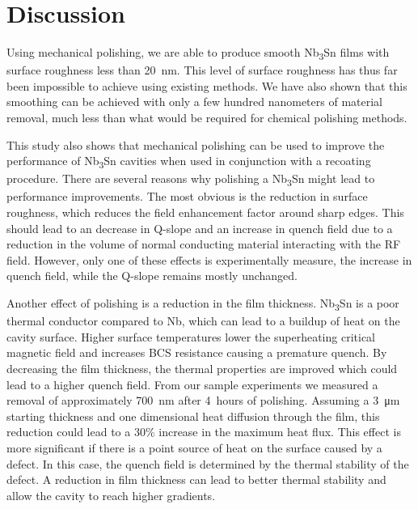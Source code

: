 \documentclass[reprint,amsmath,amssymb,aps]{revtex4-2}%
\begin{document}
%
\section{Discussion}%
\label{sec:Discussion}%
Using mechanical polishing, we are able to produce smooth Nb\textsubscript{3}Sn films with surface roughness less than 20~nm. This level of surface roughness has thus far been impossible to achieve using existing methods.\cite{posen2021advances,pudasaini2018studies,pudasaini2017post,hu2019reducing} We have also shown that this smoothing can be achieved with only a few hundred nanometers of material removal, much less than what would be required for chemical polishing methods.

This study also shows that mechanical polishing can be used to improve the performance of Nb\textsubscript{3}Sn cavities when used in conjunction with a recoating procedure. There are several reasons why polishing a Nb\textsubscript{3}Sn might lead to performance improvements. The most obvious is the reduction in surface roughness, which reduces the field enhancement factor around sharp edges. This should lead to an decrease in Q-slope and an increase in quench field\cite{knobloch1999high, xu2016simulation} due to a reduction in the volume of normal conducting material interacting with the RF field. However, only one of these effects is experimentally measure, the increase in quench field, while the Q-slope remains mostly unchanged.

Another effect of polishing is a reduction in the film thickness. Nb\textsubscript{3}Sn is a poor thermal conductor compared to Nb, which can lead to a buildup of heat on the cavity surface. Higher surface temperatures lower the superheating critical magnetic field and increases BCS resistance causing a premature quench. By decreasing the film thickness, the thermal properties are improved which could lead to a higher quench field\cite{kulyavtsev2021simulations}. From our sample experiments we measured a removal of approximately 700~nm after 4~hours of polishing. Assuming a 3~\unit{\micro\metre} starting thickness and one dimensional heat diffusion through the film, this reduction could lead to a 30\% increase in the maximum heat flux. This effect is more significant if there is a point source of heat on the surface caused by a defect\cite{porter2021advancing}. In this case, the quench field is determined by the thermal stability of the defect. A reduction in film thickness can lead to better thermal stability and allow the cavity to reach higher gradients.
\end{document}
